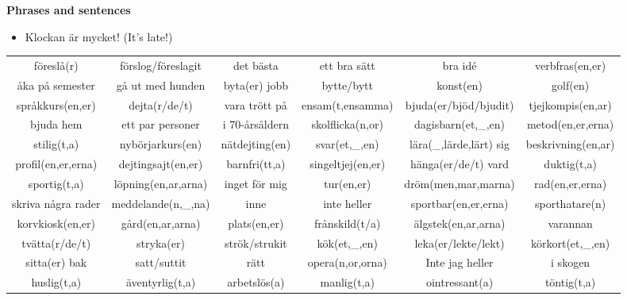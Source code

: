 
\begin{flushleft}
    \textbf{Phrases and sentences}
    \begin{itemize}
        \item Klockan är mycket! (It's late!)
    \end{itemize}
\end{flushleft}

\begin{center}
    \begin{adjustwidth}{-2.8cm}{}
        \begin{tabular}{|c c c c c c|}
            \hline
            föreslå(r) & förslog/föreslagit & det bästa & ett bra sätt & bra id\'e & verbfras(en,er) \\
            åka på semester & gå ut med hunden & byta(er) jobb & bytte/bytt & konst(en) & golf(en) \\
            språkkurs(en,er) & dejta(r/de/t) & vara trött på & ensam(t,ensamma) & bjuda(er/bjöd/bjudit) & tjejkompis(en,ar) \\
            bjuda hem & ett par personer & i 70-årsåldern & skolflicka(n,or) & dagisbarn(et,\_,en) & metod(en,er,erna) \\
            stilig(t,a) & nybörjarkurs(en) & nätdejting(en) & svar(et,\_,en) & lära(\_,lärde,lärt) sig & beskrivning(en,ar) \\
            profil(en,er,erna) & dejtingsajt(en,er) & barnfri(tt,a) & singeltjej(en,er) & hänga(er/de/t) vard & duktig(t,a) \\
            sportig(t,a) & löpning(en,ar,arna) & inget för mig & tur(en,er) & dröm(men,mar,marna) & rad(en,er,erna) \\
            skriva några rader & meddelande(n,\_,na) & inne & inte heller & sportbar(en,er,erna) & sporthatare(n) \\
            korvkiosk(en,er) & gård(en,ar,arna) & plats(en,er) & frånskild(t/a) & älgstek(en,ar,arna) & varannan \\
            tvätta(r/de/t) & stryka(er) & strök/strukit & kök(et,\_,en) & leka(er/lekte/lekt) & körkort(et,\_,en) \\
            sitta(er) bak & satt/suttit & rätt & opera(n,or,orna) & Inte jag heller & i skogen \\
            huslig(t,a) & äventyrlig(t,a) & arbetslös(a) & manlig(t,a) & ointressant(a) & töntig(t,a) \\

\end{tabular}
\end{adjustwidth}
\end{center}
